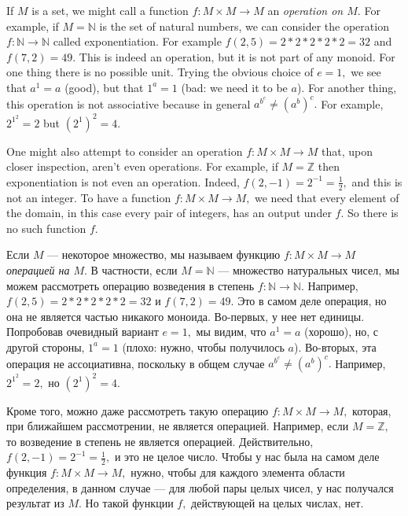\documentclass[../main/CT4S-EN-RU]{subfiles}
\begin{document}
\begin{exampleENG}
If $M$ is a set, we might call a function $f\colon M\times M{→} M$ an {\em operation on $M$}. For example, if $M={ℕ}$ is the set of natural numbers, we can consider the operation $f\colon{ℕ}{→}{ℕ}$ called exponentiation. For example $f(2,5)=2*2*2*2*2=32$ and $f(7,2)=49.$ This is indeed an operation, but it is not part of any monoid. For one thing there is no possible unit. Trying the obvious choice of $e=1,$ we see that $a^1=a$ (good), but that $1^a=1$ (bad: we need it to be $a$). For another thing, this operation is not associative because in general $a^{b^c}\neq (a^b)^c.$ For example, $2^{1^2}=2$ but $(2^1)^2=4.$

One might also attempt to consider an operation $f\colon M\times M{→} M$ that, upon closer inspection, aren't even operations. For example, if $M={ℤ}$ then exponentiation is not even an operation. Indeed, $f(2,-1)=2^{-1}=\frac{1}{2},$ and this is not an integer. To have a function $f\colon M\times M{→} M,$ we need that every element of the domain, in this case every pair of integers, has an output under $f.$ So there is no such function $f.$
\end{exampleENG}

\begin{exampleRUS}[Не моноид]
Если $M$ — некоторое множество, мы называем функцию $f\colon M\times M{→} M$ {\em операцией на $M$}. В частности, если $M={ℕ}$ — множество натуральных чисел, мы можем рассмотреть операцию возведения в степень $f\colon{ℕ}{→}{ℕ}.$ Например, $f(2,5)=2*2*2*2*2=32$ и $f(7,2)=49.$ Это в самом деле операция, но она не является частью никакого моноида. Во-первых, у нее нет единицы. Попробовав очевидный вариант $e=1,$ мы видим, что $a^1=a$ (хорошо), но, с другой стороны, $1^a=1$ (плохо: нужно, чтобы получилось $a$). Во-вторых, эта операция не ассоциативна, поскольку в общем случае $a^{b^c}\neq (a^b)^c.$ Например, $2^{1^2}=2,$ но $(2^1)^2=4.$

Кроме того, можно даже рассмотреть такую операцию $f\colon M\times M{→} M,$ которая, при ближайшем рассмотрении, не является операцией. Например, если $M={ℤ},$ то возведение в степень не является операцией. Действительно, $f(2,-1)=2^{-1}=\frac{1}{2},$ и это не целое число. Чтобы у нас была на самом деле функция $f\colon M\times M{→} M,$ нужно, чтобы для каждого элемента области определения, в данном случае — для любой пары целых чисел, у нас получался результат из $M.$ Но такой функции $f,$ действующей на целых числах, нет.
\end{exampleRUS}
\end{document}
